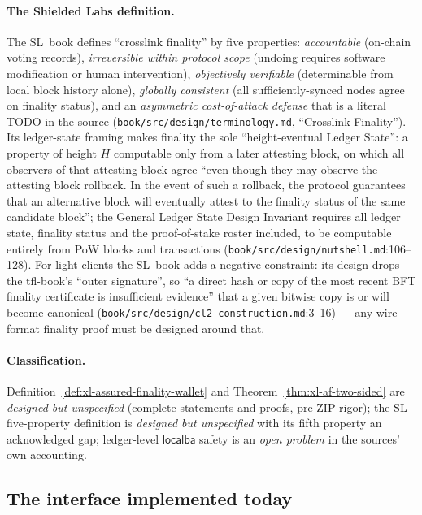 \documentclass[11pt,a4paper]{article}
\theoremstyle{definition}
\begin{document}
\paragraph{The Shielded Labs definition.} The SL~book defines ``crosslink
finality'' by five properties: \emph{accountable} (on-chain voting
records), \emph{irreversible within protocol scope} (undoing requires
software modification or human intervention), \emph{objectively
verifiable} (determinable from local block history alone), \emph{globally
consistent} (all sufficiently-synced nodes agree on finality status), and
an \emph{asymmetric cost-of-attack defense} that is a literal TODO in the
source (\texttt{book/src/design/terminology.md}, ``Crosslink Finality'').
Its ledger-state framing makes finality the sole ``height-eventual Ledger
State'': a property of height $H$ computable only from a later attesting
block, on which all observers of that attesting block agree ``even though
they may observe the attesting block rollback. In the event of such a
rollback, the protocol guarantees that an alternative block will
eventually attest to the finality status of the same candidate block'';
the General Ledger State Design Invariant requires all ledger state,
finality status and the proof-of-stake roster included, to be computable
entirely from PoW blocks and transactions
(\texttt{book/src/design/nutshell.md}:106--128). For light clients the
SL~book adds a negative constraint: its design drops the tfl-book's
``outer signature'', so ``a direct hash or copy of the most recent BFT
finality certificate is insufficient evidence'' that a given bitwise copy
is or will become canonical
(\texttt{book/src/design/cl2-construction.md}:3--16) --- any wire-format
finality proof must be designed around that.

\paragraph{Classification.}
Definition~\ref{def:xl-assured-finality-wallet} and
Theorem~\ref{thm:xl-af-two-sided} are \emph{designed but unspecified}
(complete statements and proofs, pre-ZIP rigor); the SL five-property
definition is \emph{designed but unspecified} with its fifth property an
acknowledged gap; ledger-level $\mathsf{localba}$ safety is an
\emph{open problem} in the sources' own accounting.

\subsection{The interface implemented today}\label{sec:xl-node-interface}
\end{document}
